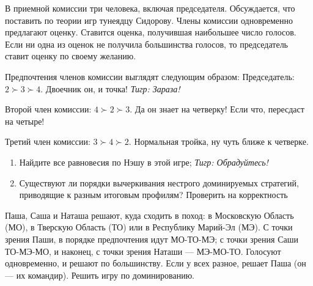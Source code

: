 \begin{problem} \par %
В приемной комиссии три человека, включая председателя. Обсуждается, что поставить по теории игр тунеядцу Сидорову. Члены комиссии одновременно предлагают оценку. Ставится оценка, получившая наибольшее число голосов. Если ни одна из оценок не получила большинства голосов, то председатель ставит оценку по своему желанию.\par
Предпочтения членов комиссии выглядят следующим образом:
Председатель:  $2\succ 3\succ 4$. Двоечник он, и точка! {\it Тигр: Зараза!}\par
Второй член комиссии:  $4\succ 2\succ 3$. Да он знает на четверку! Если что, пересдаст на четыре!\par
Третий член комиссии:  $3\succ 4\succ 2$. Нормальная тройка, ну чуть ближе к четверке.\par
\begin{enumerate}
\item	Найдите все равновесия по Нэшу в этой игре; {\it Тигр: Обрадуйтесь!}\par
\item	Существуют ли порядки вычеркивания нестрого доминируемых стратегий, приводящие к разным итоговым профилям? {\red Проверить на корректность}
\end{enumerate}
\begin{sol}

\end{sol}
\end{problem}

\begin{problem}
\begin{source}
\cite{savva:nmu}
\end{source}
Паша, Саша и Наташа решают, куда сходить в поход: в Московскую Область (МО), в Тверскую Область (ТО) или в Республику Марий-Эл (МЭ). С точки зрения Паши, в порядке предпочтения идут МО-ТО-МЭ; с точки зрения Саши ТО-МЭ-МО, и наконец, с точки зрения Наташи --- МЭ-МО-ТО. Голосуют одновременно, и решают по большинству. Если у всех разное, решает Паша (он --- их командир). Решить игру по доминированию.






\begin{sol}

\end{sol}
\end{problem}

